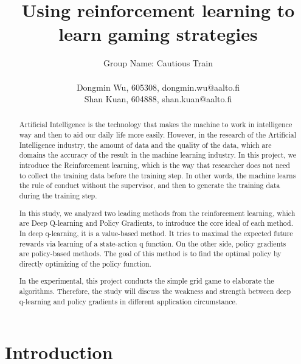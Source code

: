 \documentclass[article]{aaltoseries}
\begin{document}

\title{Using reinforcement learning to learn gaming strategies}
\author{Group Name: Cautious Train\\\\Dongmin Wu, 605308, dongmin.wu@aalto.fi%
\\{Shan Kuan, 604888, shan.kuan@aalto.fi}} %

\maketitle
\begin{abstract}
Artificial Intelligence is the technology that makes the machine to work in intelligence way and then to aid our daily life more easily. However, in the research of the Artificial Intelligence industry, the amount of data and the quality of the data, which are domains the accuracy of the result in the machine learning industry. In this project, we introduce the Reinforcement learning, which is the way that researcher does not need to collect the training data before the training step. In other words, the machine learns the rule of conduct without the supervisor, and then to generate the training data during the training step.

In this study, we analyzed two leading methods from the reinforcement learning, which are Deep Q-learning and Policy Gradients, to introduce the core ideal of each method. In deep q-learning, it is a value-based method. It tries to maximal the expected future rewards via learning of a state-action q function. On the other side, policy gradients are policy-based methods. The goal of this method is to find the optimal policy by directly optimizing of the policy function.

In the experimental, this project conducts the simple grid game to elaborate the algorithms. Therefore, the study will discuss the weakness and strength between deep q-learning and policy gradients in different application circumstance. 
  
\end{abstract}




\section{Introduction}
\end{document}
